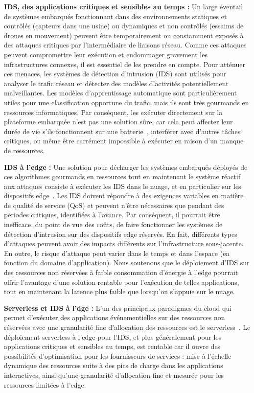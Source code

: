 \textbf{IDS, des applications critiques et sensibles au temps :} 
Un large éventail de systèmes embarqués fonctionnant dans des environnements statiques et contrôlés (capteurs dans une usine) ou dynamiques et non contrôlés (essaims de drones en mouvement) peuvent être temporairement ou constamment exposés à des attaques critiques par l'intermédiaire de liaisons réseau. Comme ces attaques peuvent compromettre leur exécution et endommager gravement les infrastructures connexes, il est essentiel de les prendre en compte. Pour atténuer ces menaces, les systèmes de détection d'intrusion (IDS) sont utilisés pour analyser le trafic réseau et détecter des modèles d'activités potentiellement malveillantes. Les modèles d'apprentissage automatique sont particulièrement utiles pour une classification opportune du trafic, mais ils sont très gourmands en ressources informatiques. Par conséquent, les exécuter directement sur la plateforme embarquée n'est pas une solution sûre, car cela peut affecter leur durée de vie s'ils fonctionnent sur une batterie~\cite{slimani:hal-04159551}, interférer avec d'autres tâches critiques, ou même être carrément impossible à exécuter en raison d'un manque de ressources.

\textbf{IDS à l'edge :} Une solution pour décharger les systèmes embarqués déployés de ces algorithmes gourmands en ressources tout en maintenant le système réactif aux attaques consiste à exécuter les IDS dans le nuage, et en particulier sur les dispositifs edge~\cite{eskandari2020}. Les IDS doivent répondre à des exigences variables en matière de qualité de service (QoS) et peuvent n'être nécessaires que pendant des périodes critiques, identifiées à l'avance. Par conséquent, il pourrait être inefficace, du point de vue des coûts, de faire fonctionner les systèmes de détection d'intrusion sur des dispositifs edge réservés. En fait, différents types d'attaques peuvent avoir des impacts différents sur l'infrastructure sous-jacente. En outre, le risque d'attaque peut varier dans le temps et dans l'espace (en fonction du domaine d'application). Nous soutenons que le déploiement d'IDS sur des ressources non réservées à faible consommation d'énergie à l'edge pourrait offrir l'avantage d'une solution rentable pour l'exécution de telles applications, tout en maintenant la latence plus faible que lorsqu'on s'appuie sur le nuage.

\textbf{Serverless et IDS à l'dge :} L'un des principaux paradigmes du cloud qui permet d'exécuter des applications événementielles sur des ressources non réservées avec une granularité fine d'allocation des ressources est le serverless~\cite{Lannurien2023}. Le déploiement serverless à l'edge pour l'IDS, et plus généralement pour les applications critiques et sensibles au temps, est rentable car il ouvre des possibilités d'optimisation pour les fournisseurs de services : mise à l'échelle dynamique des ressources suite à des pics de charge dans les applications interactives, ainsi qu'une granularité d'allocation fine et mesurée pour les ressources limitées à l'edge.

